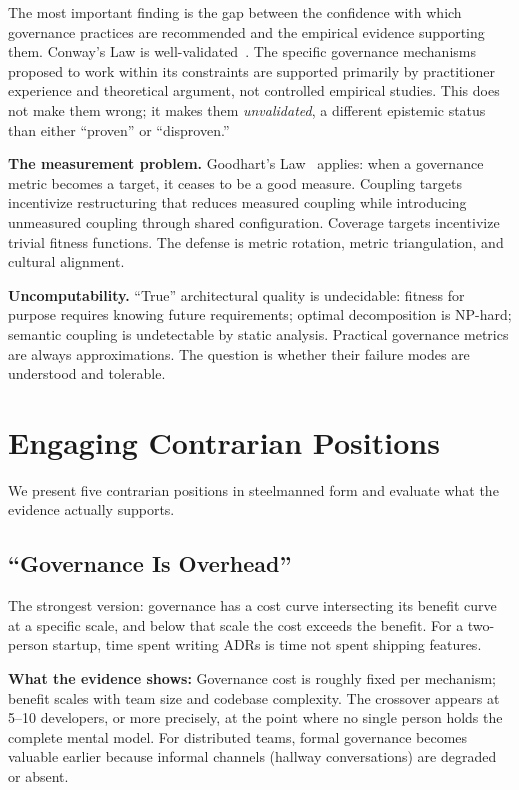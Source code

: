 \documentclass[11pt, a4paper, logo, copyright]{googledeepmind}
\begin{document}
The most important finding is the gap between the confidence with which governance practices are recommended and the empirical evidence supporting them. Conway's Law is well-validated~\citep{conway1968, nagappan2008, maccormack2008}. The specific governance mechanisms proposed to work within its constraints are supported primarily by practitioner experience and theoretical argument, not controlled empirical studies. This does not make them wrong; it makes them \emph{unvalidated}, a different epistemic status than either ``proven'' or ``disproven.''

\textbf{The measurement problem.} Goodhart's Law~\citep{goodhart1975} applies: when a governance metric becomes a target, it ceases to be a good measure. Coupling targets incentivize restructuring that reduces measured coupling while introducing unmeasured coupling through shared configuration. Coverage targets incentivize trivial fitness functions. The defense is metric rotation, metric triangulation, and cultural alignment.

\textbf{Uncomputability.} ``True'' architectural quality is undecidable: fitness for purpose requires knowing future requirements; optimal decomposition is NP-hard; semantic coupling is undetectable by static analysis. Practical governance metrics are always approximations. The question is whether their failure modes are understood and tolerable.


\section{Engaging Contrarian Positions}
\label{sec:contrarian}

We present five contrarian positions in steelmanned form and evaluate what the evidence actually supports.

\subsection{``Governance Is Overhead''}

The strongest version: governance has a cost curve intersecting its benefit curve at a specific scale, and below that scale the cost exceeds the benefit. For a two-person startup, time spent writing ADRs is time not spent shipping features.

\textbf{What the evidence shows:} Governance cost is roughly fixed per mechanism; benefit scales with team size and codebase complexity. The crossover appears at 5--10 developers, or more precisely, at the point where no single person holds the complete mental model. For distributed teams, formal governance becomes valuable earlier because informal channels (hallway conversations) are degraded or absent.
\end{document}
